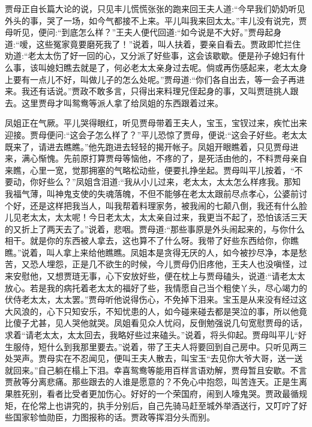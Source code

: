 \begin{parag}
    贾母正自长篇大论的说，只见丰儿慌慌张张的跑来回王夫人道:“今早我们奶奶听见外头的事，哭了一场，如今气都接不上来。平儿叫我来回太太。”丰儿没有说完，贾母听见，便问:“到底怎么样？”王夫人便代回道:“如今说是不大好。”贾母起身道:“嗳，这些冤家竟要磨死我了！”说着，叫人扶着，要亲自看去。贾政即忙拦住劝道:“老太太伤了好一回的心，又分派了好些事，这会该歇歇。便是孙子媳妇有什么事，该叫媳妇瞧去就是了，何必老太太亲身过去呢。倘或再伤感起来，老太太身上要有一点儿不好，叫做儿子的怎么处呢。”贾母道:“你们各自出去，等一会子再进来。我还有话说。”贾政不敢多言，只得出来料理兄侄起身的事，又叫贾琏挑人跟去。这里贾母才叫鸳鸯等派人拿了给凤姐的东西跟着过来。
\end{parag}


\begin{parag}
    凤姐正在气厥。平儿哭得眼红，听见贾母带着王夫人，宝玉，宝钗过来，疾忙出来迎接。贾母便问:“这会子怎么样了？”平儿恐惊了贾母，便说:“这会子好些。老太太既来了，请进去瞧瞧。”他先跑进去轻轻的揭开帐子。凤姐开眼瞧着，只见贾母进来，满心惭愧。先前原打算贾母等恼他，不疼的了，是死活由他的，不料贾母亲自来瞧，心里一宽，觉那拥塞的气略松动些，便要扎挣坐起。贾母叫平儿按着，“不要动，你好些么？”凤姐含泪道:“我从小儿过来，老太太，太太怎么样疼我。那知我福气薄，叫神鬼支使的失魂落魄，不但不能够在老太太跟前尽点孝心，公婆前讨个好，还是这样把我当人，叫我帮着料理家务，被我闹的七颠八倒，我还有什么脸儿见老太太，太太呢！今日老太太，太太亲自过来，我更当不起了，恐怕该活三天的又折上了两天去了。”说着，悲咽。贾母道:“那些事原是外头闹起来的，与你什么相干。就是你的东西被人拿去，这也算不了什么呀。我带了好些东西给你，你瞧瞧。”说着，叫人拿上来给他瞧瞧。凤姐本是贪得无厌的人，如今被抄尽净，本是愁苦，又恐人埋怨，正是几不欲生的时候，今儿贾母仍旧疼他，王夫人也没嗔怪，过来安慰他，又想贾琏无事，心下安放好些，便在枕上与贾母磕头，说道:“请老太太放心。若是我的病托着老太太的福好了些，我情愿自己当个粗使丫头，尽心竭力的伏侍老太太，太太罢。”贾母听他说得伤心，不免掉下泪来。宝玉是从来没有经过这大风浪的，心下只知安乐，不知忧患的人，如今碰来碰去都是哭泣的事，所以他竟比傻子尤甚，见人哭他就哭。凤姐看见众人忧闷，反倒勉强说几句宽慰贾母的话，求着“请老太太，太太回去，我略好些过来磕头。”说着，将头仰起。贾母叫平儿“好生服侍，短什么到我那里要去。”说着，带了王夫人将要回到自己房中。只听见两三处哭声。贾母实在不忍闻见，便叫王夫人散去，叫宝玉“去见你大爷大哥，送一送就回来。”自己躺在榻上下泪。幸喜鸳鸯等能用百样言语劝解，贾母暂且安歇。不言贾赦等分离悲痛。那些跟去的人谁是愿意的？不免心中抱怨，叫苦连天。正是生离果胜死别，看者比受者更加伤心。好好的一个荣国府，闹到人嚎鬼哭。贾政最循规矩，在伦常上也讲究的，执手分别后，自己先骑马赶至城外举酒送行，又叮咛了好些国家轸恤勋臣，力图报称的话。贾政等挥泪分头而别。
\end{parag}


